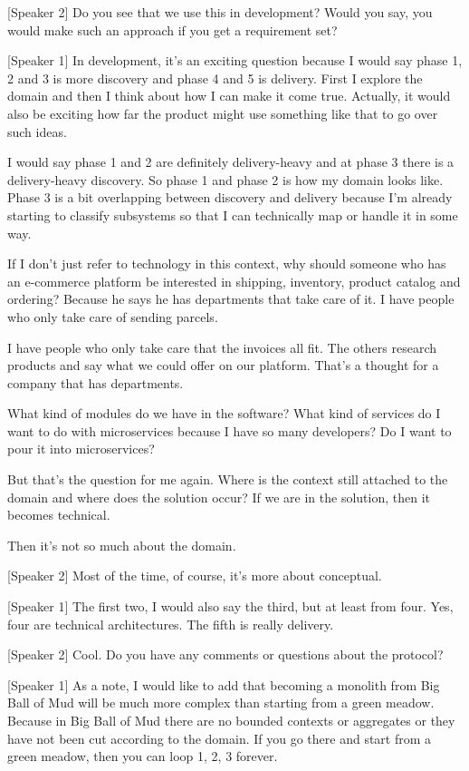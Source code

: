[Speaker 2]
Do you see that we use this in development? Would you say, you would make such an approach if you get a requirement set?

[Speaker 1]
In development, it's an exciting question because I would say phase 1, 2 and 3 is more discovery and phase 4 and 5 is delivery. First I explore the domain and then I think about how I can make it come true. Actually, it would also be exciting how far the product might use something like that to go over such ideas.

I would say phase 1 and 2 are definitely delivery-heavy and at phase 3 there is a delivery-heavy discovery. So phase 1 and phase 2 is how my domain looks like. Phase 3 is a bit overlapping between discovery and delivery because I'm already starting to classify subsystems so that I can technically map or handle it in some way.

If I don't just refer to technology in this context, why should someone who has an e-commerce platform be interested in shipping, inventory, product catalog and ordering? Because he says he has departments that take care of it. I have people who only take care of sending parcels.

I have people who only take care that the invoices all fit. The others research products and say what we could offer on our platform. That's a thought for a company that has departments.

What kind of modules do we have in the software? What kind of services do I want to do with microservices because I have so many developers? Do I want to pour it into microservices?

But that's the question for me again. Where is the context still attached to the domain and where does the solution occur? If we are in the solution, then it becomes technical.

Then it's not so much about the domain.

[Speaker 2]
Most of the time, of course, it's more about conceptual.

[Speaker 1]
The first two, I would also say the third, but at least from four. Yes, four are technical architectures. The fifth is really delivery.

[Speaker 2]
Cool. Do you have any comments or questions about the protocol?

[Speaker 1]
As a note, I would like to add that becoming a monolith from Big Ball of Mud will be much more complex than starting from a green meadow. Because in Big Ball of Mud there are no bounded contexts or aggregates or they have not been cut according to the domain. If you go there and start from a green meadow, then you can loop 1, 2, 3 forever.

